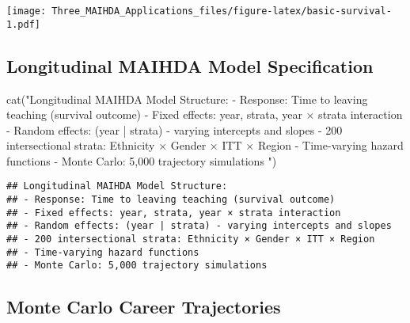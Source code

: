\documentclass[
]{article}
\newenvironment{Shaded}{\begin{snugshade}}{\end{snugshade}}
\newcommand{\FunctionTok}[1]{\textcolor[rgb]{0.00,0.00,0.00}{#1}}
\newcommand{\NormalTok}[1]{#1}
\newcommand{\StringTok}[1]{\textcolor[rgb]{0.31,0.60,0.02}{#1}}
\begin{document}
\texttt{[image: Three\_MAIHDA\_Applications\_files/figure-latex/basic-survival-1.pdf]}

\hypertarget{longitudinal-maihda-model-specification}{%
\subsection{Longitudinal MAIHDA Model
Specification}\label{longitudinal-maihda-model-specification}}

\begin{Shaded}
\begin{Highlighting}[]
\FunctionTok{cat}\NormalTok{(}\StringTok{"Longitudinal MAIHDA Model Structure:}
\StringTok{{-} Response: Time to leaving teaching (survival outcome)}
\StringTok{{-} Fixed effects: year, strata, year × strata interaction}
\StringTok{{-} Random effects: (year | strata) {-} varying intercepts and slopes}
\StringTok{{-} 200 intersectional strata: Ethnicity × Gender × ITT × Region}
\StringTok{{-} Time{-}varying hazard functions}
\StringTok{{-} Monte Carlo: 5,000 trajectory simulations}
\StringTok{"}\NormalTok{)}
\end{Highlighting}
\end{Shaded}

\begin{verbatim}
## Longitudinal MAIHDA Model Structure:
## - Response: Time to leaving teaching (survival outcome)
## - Fixed effects: year, strata, year × strata interaction
## - Random effects: (year | strata) - varying intercepts and slopes
## - 200 intersectional strata: Ethnicity × Gender × ITT × Region
## - Time-varying hazard functions
## - Monte Carlo: 5,000 trajectory simulations
\end{verbatim}

\hypertarget{monte-carlo-career-trajectories}{%
\subsection{Monte Carlo Career
Trajectories}\label{monte-carlo-career-trajectories}}
\end{document}
